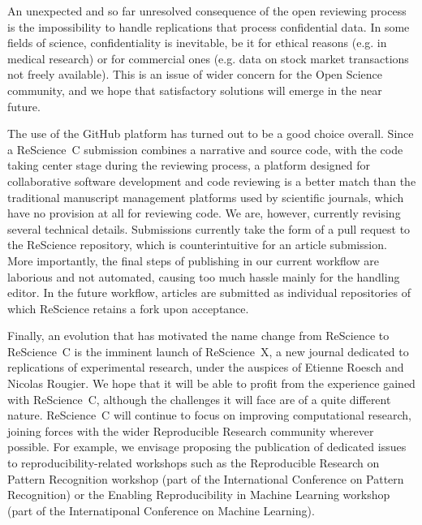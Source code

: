 \documentclass[runningheads]{llncs}
\begin{document}
An unexpected and so far unresolved consequence of the open reviewing process is the impossibility to handle replications that process confidential data. In some fields of science, confidentiality is inevitable, be it for ethical reasons (e.g. in medical research) or for commercial ones (e.g. data on stock market transactions not freely available). This is an issue of wider concern for the Open Science community, and we hope that satisfactory solutions will emerge in the near future.

The use of the GitHub platform has turned out to be a good choice overall. Since a ReScience~C submission combines a narrative and source code, with the code taking center stage during the reviewing process, a platform designed for collaborative software development and code reviewing is a better match than the traditional manuscript management platforms used by scientific journals, which have no provision at all for reviewing code. We are, however, currently revising several technical details. Submissions currently take the form of a pull request to the ReScience repository, which is counterintuitive for an article submission. More importantly, the final steps of publishing in our current workflow are laborious and not automated, causing too much hassle mainly for the handling editor. In the future workflow, articles are submitted as individual repositories of which ReScience retains a fork upon acceptance.

Finally, an evolution that has motivated the name change from ReScience to ReScience~C is the imminent launch of ReScience~X, a new journal dedicated to replications of experimental research, under the auspices of Etienne Roesch and Nicolas Rougier. We hope that it will be able to profit from the experience gained with ReScience~C, although the challenges it will face are of a quite different nature. ReScience~C will continue to focus on improving computational research, joining forces with the wider Reproducible Research community wherever possible. For example, we envisage proposing the publication of dedicated issues to reproducibility-related workshops such as the Reproducible Research on Pattern Recognition workshop (part of the International Conference on Pattern Recognition) or the Enabling Reproducibility in Machine Learning workshop (part of the Internatiponal Conference on Machine Learning).

%
%


%
\end{document}
